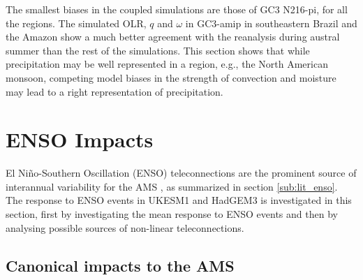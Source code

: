 The smallest biases in the coupled simulations are those of GC3 N216-pi, for all the regions.  The simulated OLR, $q$ and $\omega$ in GC3-amip in southeastern Brazil and the Amazon show a much better agreement with the reanalysis during austral summer than the rest of the simulations.
This section shows that while precipitation may be well represented in a region, e.g., the North American monsoon, competing model biases in the strength of convection and moisture may lead to a right representation of precipitation. 


\section{ENSO Impacts}\label{sq:enso1}

El Ni\~no-Southern Oscillation (ENSO) teleconnections are the prominent source of interannual variability for the AMS \citep{vera2006}, as summarized in section \ref{sub:lit_enso}.
The response to ENSO events in UKESM1 and HadGEM3 is investigated in this section, first by investigating the mean response to ENSO events and then by analysing possible sources of non-linear teleconnections.




\subsection{Canonical impacts to the AMS}

